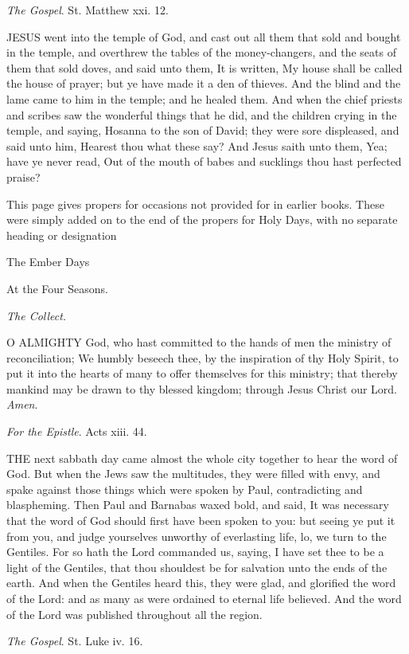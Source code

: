\emph{The Gospel}. St. Matthew xxi. 12.

JESUS
went into the temple of God, and cast out all them that sold and bought
in the temple, and overthrew the tables of the money-changers, and the
seats of them that sold doves, and said unto them, It is written, My house
shall be called the house of prayer; but ye have made it a den of thieves.
And the blind and the lame came to him in the temple; and he healed them.
And when the chief priests and scribes saw the wonderful things that he
did, and the children crying in the temple, and saying, Hosanna to the
son of David; they were sore displeased, and said unto him, Hearest thou
what these say? And Jesus saith unto them, Yea; have ye never read, Out
of the mouth of babes and sucklings thou hast perfected praise?

This
page gives propers for occasions not provided for in earlier books. These
were simply added on to the end of the propers for Holy Days, with no
separate heading or designation

The Ember Days

At the Four Seasons.

\emph{The Collect.}

O
ALMIGHTY God, who hast committed to the hands of men the ministry of reconciliation;
We humbly beseech thee, by the inspiration of thy Holy Spirit, to put
it into the hearts of many to offer themselves for this ministry; that
thereby mankind may be drawn to thy blessed kingdom; through Jesus Christ
our Lord. \emph{Amen}.

\emph{For the Epistle}. Acts xiii. 44.

THE
next sabbath day came almost the whole city together to hear the word
of God. But when the Jews saw the multitudes, they were filled with envy,
and spake against those things which were spoken by Paul, contradicting
and blaspheming. Then Paul and Barnabas waxed bold, and said, It was necessary
that the word of God should first have been spoken to you: but seeing
ye put it from you, and judge yourselves unworthy of everlasting life,
lo, we turn to the Gentiles. For so hath the Lord commanded us, saying,
I have set thee to be a light of the Gentiles, that thou shouldest be
for salvation unto the ends of the earth. And when the Gentiles heard
this, they were glad, and glorified the word of the Lord: and as many
as were ordained to eternal life believed. And the word of the Lord was
published throughout all the region.

\emph{The Gospel}. St. Luke iv. 16.

